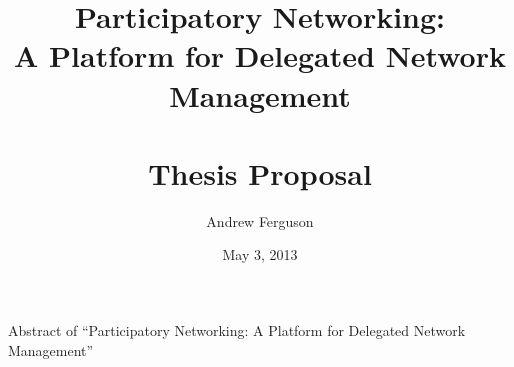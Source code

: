 \documentclass[10pt,oneside,openany]{book}
\begin{document}
\VerbatimFootnotes

\author{Andrew Ferguson}
\title{Participatory Networking: \\ A Platform for Delegated Network Management \\ \ \\ Thesis Proposal}
\date{May 3, 2013}



%

\frontmatter %

\maketitle %
\tableofcontents %

\mainmatter %

\doublespacing

\def\abstract#1{\gdef\d@abstract{#1}}
\def\d@abstract{}
\def\abstractpage{%
  \thispagestyle{empty}
  \noindent Abstract of ``Participatory Networking: A Platform for Delegated Network Management''
  \\
  
  \vfill\newpage}
  
\abstractpage





%








\backmatter %



\end{document}
